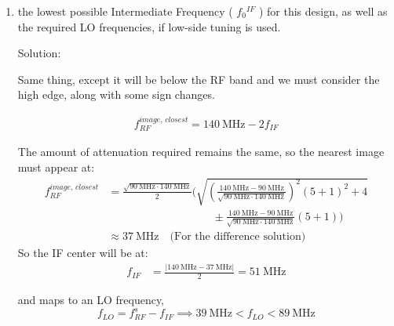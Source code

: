 \begin{homeworkProblem}
\begin{enumerate}[1.]
\begin{callout}{Solution:}
            Which also maps to an LO frequency,
            $$f_{LO} = f_{RF}^s + f_{IF} \implies 213\mathrm{~MHz} < f_{LO} < 263\mathrm{~MHz}$$

            \end{callout}
        \item the lowest possible Intermediate Frequency ( $f_0{ }^{I F}$ ) for this design, as well as the required LO frequencies, if low-side tuning is used.
            \begin{callout}{Solution:}

            Same thing, except it will be below the RF band and we must consider the high edge, along with some sign changes.

            \begin{align*}
                f_{RF}^{image,\,closest} = 140~\mathrm{MHz}-2f_{IF}
            \end{align*}

            The amount of attenuation required remains the same, so the nearest image must appear at:
            \begin{align*}
                f_{RF}^{image,\,closest}&=\frac{\sqrt{90~\mathrm{MHz} \cdot 140~\mathrm{MHz}}}{2}\Bigg(\sqrt{\left(\frac{140~\mathrm{MHz}-90~\mathrm{MHz}}{\sqrt{90~\mathrm{MHz} \cdot 140~\mathrm{MHz}}}\right)^2(5+1)^2+4} \\ 
                                        &\hspace{4cm}\pm \frac{140~\mathrm{MHz}-90~\mathrm{MHz}}{\sqrt{90~\mathrm{MHz} \cdot 140~\mathrm{MHz}}}(5+1)\Bigg) \\
                                        &\approx 37~\mathrm{MHz} \quad \text{(For the difference solution)}
            \end{align*}
            So the IF center will be at:
            \begin{align*}
                f_{IF} &= \frac{|140\mathrm{~MHz}-37\mathrm{~MHz}|}{2}  = 51\mathrm{~MHz}
            \end{align*}

            and maps to an LO frequency,
            $$f_{LO} = f_{RF}^s - f_{IF} \implies \mathrm{39~MHz} < f_{LO} < \mathrm{89~MHz}$$


            \end{callout}
    \end{enumerate}
\end{homeworkProblem}

